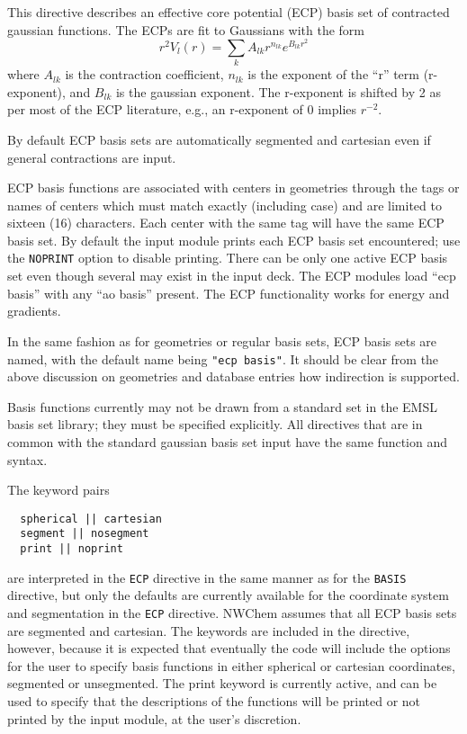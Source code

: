 \label{sec:ecp}

This directive describes an effective core potential (ECP) basis set
of contracted gaussian functions.  The ECPs are fit to Gaussians 
with the form 
\[
 r^2V_l(r) = \sum_{k} A_{lk} r^{n_{lk}} e^{B_{lk}r^{2}}
\]
where $A_{lk}$ is the contraction coefficient, $n_{lk}$ is the
exponent of the ``r'' term (r-exponent), and $B_{lk}$ is the gaussian
exponent.  The r-exponent is shifted by 2 as per most of the ECP
literature, e.g., an r-exponent of 0 implies $r^{-2}$.

By default ECP basis sets are automatically segmented and cartesian
even if general contractions are input. 

ECP basis functions are associated with centers in geometries through
the tags or names of centers which must match exactly (including case)
and are limited to sixteen (16) characters.  Each center with the same
tag will have the same ECP basis set.  By default the input module
prints each ECP basis set encountered; use the \verb+NOPRINT+ option
to disable printing.  There can be only one active ECP basis set even
though several may exist in the input deck.  The ECP modules load
``ecp basis'' with any ``ao basis'' present.  The ECP functionality
works for energy and gradients.

In the same fashion as for geometries or regular basis sets, ECP basis
sets are named, with the default name being \verb+"ecp basis"+.  It
should be clear from the above discussion on geometries and database
entries how indirection is supported.

Basis functions currently may not be drawn from a standard set in the
EMSL basis set library; they must be specified explicitly.  All
directives that are in common with the standard gaussian basis set
input have the same function and syntax.

The keyword pairs

\begin{verbatim}
  spherical || cartesian
  segment || nosegment
  print || noprint
\end{verbatim}

are interpreted in the \verb+ECP+ directive in the same manner as for
the \verb+BASIS+ directive, but only the defaults are currently
available for the coordinate system and segmentation in the \verb+ECP+
directive.  NWChem assumes that all ECP basis sets are segmented and
cartesian.  The keywords are included in the directive, however,
because it is expected that eventually the code will include the
options for the user to specify basis functions in either spherical or
cartesian coordinates, segmented or unsegmented.  The print keyword is
currently active, and can be used to specify that the descriptions of
the functions will be printed or not printed by the input module, at
the user's discretion.

